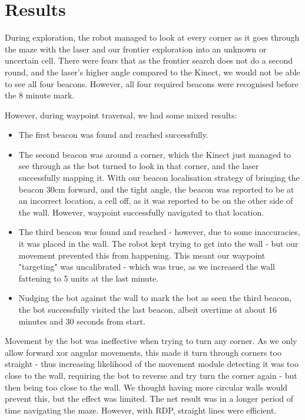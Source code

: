 \documentclass[titlepage,12pt,a4paper]{article}
\begin{document}
\pagebreak
\section{Results}
During exploration, the robot managed to look at every corner as it goes through the maze with the laser and our frontier exploration into an unknown or uncertain cell. There were fears that as the frontier search does not do a second round, and the laser's higher angle compared to the Kinect, we would not be able to see all four beacons. However, all four required beacons were recognised before the 8 minute mark.

However, during waypoint traversal, we had some mixed results:

\begin{itemize}
	\item The first beacon was found and reached successfully.
	\item The second beacon was around a corner, which the Kinect just managed to see through as the bot turned to look in that corner, and the laser successfully mapping it. With our beacon localisation strategy of bringing the beacon 30cm forward, and the tight angle, the beacon was reported to be at an incorrect location, a cell off, as it was reported to be on the other side of the wall. However, waypoint successfully navigated to that location.
	\item The third beacon was found and reached - however, due to some inaccuracies, it was placed in the wall. The robot kept trying to get into the wall - but our movement prevented this from happening. This meant our waypoint "targeting" was uncalibrated - which was true, as we increased the wall fattening to 5 units at the last minute. 
	\item Nudging the bot against the wall to mark the bot as seen the third beacon, the bot successfully visited the last beacon, albeit overtime at about 16 minutes and 30 seconds from start.
\end{itemize}

Movement by the bot was ineffective when trying to turn any corner. As we only allow forward xor angular movements, this made it turn through corners too straight - thus increasing likelihood of the movement module detecting it was too close to the wall, requiring the bot to reverse and try turn the corner again - but then being too close to the wall. We thought having more circular walls would prevent this, but the effect was limited. The net result was in a longer period of time navigating the maze. However, with RDP, straight lines were efficient.
\end{document}
